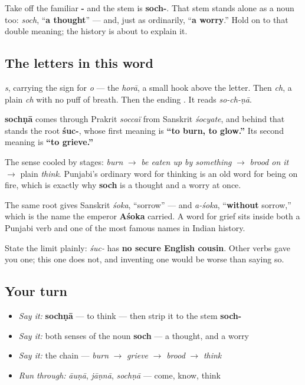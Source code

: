 Take off the familiar \textbf{-} and the stem is \textbf{soch-}. That stem stands alone as a noun too: \textbf{} \emph{soch}, “\textbf{a thought}” — and, just as ordinarily, “\textbf{a worry}.” Hold on to that double meaning; the history is about to explain it.

\subsection*{The letters in this word}
\textbf{} \emph{s}, carrying the \textbf{} sign for \emph{o} — the \emph{horā}, a small hook above the letter. Then \textbf{} \emph{ch}, a plain \emph{ch} with no puff of breath. Then the ending \textbf{}. It reads \emph{so-ch-ṇā}.

\begin{cousinweb}
\textbf{sochṇā} comes through Prakrit \emph{soccaï} from Sanskrit \emph{śocyate}, and behind that stands the root \textbf{śuc-}, whose first meaning is \textbf{“to burn, to glow.”} Its second meaning is \textbf{“to grieve.”}

The sense cooled by stages: \emph{burn} $\to$ \emph{be eaten up by something} $\to$ \emph{brood on it} $\to$ plain \emph{think}. Punjabi's ordinary word for thinking is an old word for being on fire, which is exactly why \textbf{soch} is a thought and a worry at once.

The same root gives Sanskrit \emph{śoka}, “sorrow” — and \emph{a-śoka}, “\textbf{without} sorrow,” which is the name the emperor \textbf{Aśoka} carried. A word for grief sits inside both a Punjabi verb and one of the most famous names in Indian history.

State the limit plainly: \emph{śuc-} has \textbf{no secure English cousin}. Other verbs gave you one; this one does not, and inventing one would be worse than saying so.
\end{cousinweb}

\subsection*{Your turn}
\begin{itemize}
\raggedright
  \item \emph{Say it:} \textbf{sochṇā} — to think — then strip it to the stem \textbf{soch-}
  \item \emph{Say it:} both senses of the noun \textbf{soch} — a thought, and a worry
  \item \emph{Say it:} the chain — \emph{burn} $\to$ \emph{grieve} $\to$ \emph{brood} $\to$ \emph{think}
  \item \emph{Run through:} \emph{āuṇā}, \emph{jāṇnā}, \emph{sochṇā} — come, know, think
\end{itemize}

